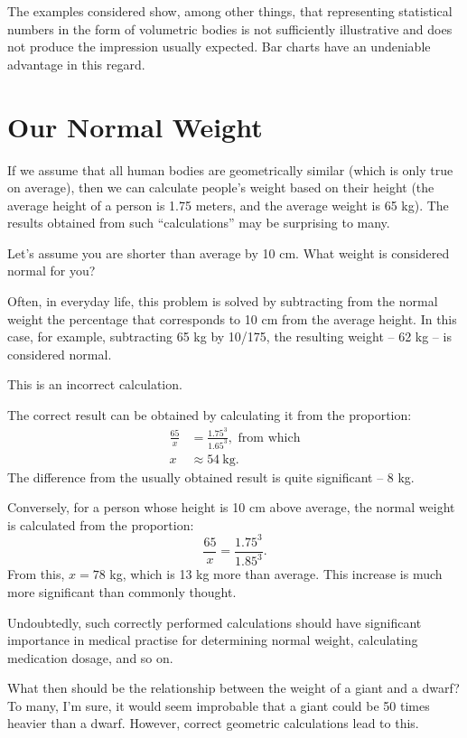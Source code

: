 The examples considered show, among other things, that representing statistical numbers in the form of volumetric bodies is not sufficiently illustrative and does not produce the impression usually expected. Bar charts have an undeniable advantage in this regard.
\clearpage	

\section{Our Normal Weight}
\label{sec-11.13}

If we assume that all human bodies are geometrically similar (which is only true on average), then we can calculate people's weight based on their height (the average height of a person is 1.75 meters, and the average weight is 65 kg). The results obtained from such ``calculations'' may be surprising to many.

Let's assume you are shorter than average by 10 cm. What weight is considered normal for you?

Often, in everyday life, this problem is solved by subtracting from the normal weight the percentage that corresponds to 10 cm from the average height. In this case, for example, subtracting 65 kg by 10/175, the resulting weight -- 62 kg -- is considered normal.

This is an incorrect calculation.

The correct result can be obtained by calculating it from the proportion:
\begin{align*}%
\frac{65}{x} & = \frac{1.75^{3}}{1.65^{3}}, \,\, \text{from which}\\
 x & \approx \SI{54}{\kilo\gram}.
\end{align*}
The difference from the usually obtained result is quite significant -- 8 kg.

Conversely, for a person whose height is 10 cm above average, the normal weight is calculated from the proportion:
\begin{equation*}%
\frac{65}{x} = \frac{1.75^{3}}{1.85^{3}}.
\end{equation*}
From this, \( x = 78 \) kg, which is 13 kg more than average. This increase is much more significant than commonly thought.

Undoubtedly, such correctly performed calculations should have significant importance in medical practise for determining normal weight, calculating medication dosage, and so on.

What then should be the relationship between the weight of a giant and a dwarf? To many, I'm sure, it would seem improbable that a giant could be 50 times heavier than a dwarf. However, correct geometric calculations lead to this.

